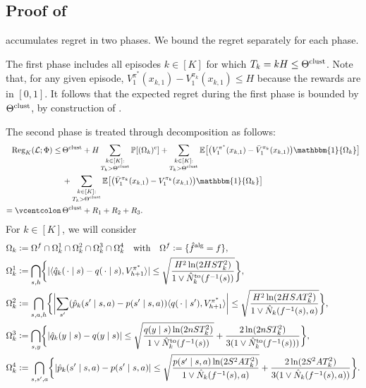 \documentclass[11pt]{article}
\newcommand{\defeq}{=\vcentcolon}
\newcommand{\eqdef}{\vcentcolon=}
\newcommand{\mbb}[1]{\mathbbm{#1}}
\newcommand{\mcL}{\mathcal{L}}
\newcommand{\mbbP}{\mathbb{P}}
\newcommand{\mbbE}{\mathbb{E}}
\newcommand{\clust}{\textnormal{clust}}
\newcommand{\alg}{\textnormal{alg}}
\theoremstyle{definition}
\theoremstyle{definition}
\begin{document}
\subsection{Proof of \texorpdfstring{}{the regret upper bound}}
\label{sec:proof_of_BUCBVI_regret_bound}

 accumulates regret in two phases.
We bound the regret separately for each phase.

The first phase includes all episodes $k\in[K]$ for which $T_k=kH\leq \Theta^{\clust}$.
Note that, for any given episode, $V^{\pi^*}_1(x_{k,1})-V_1^{\pi_k}(x_{k,1})\leq H$ because the rewards are in $[0,1]$.
It follows that the expected regret during the first phase is bounded by $\Theta^{\clust}$, by construction of .

The second phase is treated through decomposition as follows:
\begin{align}
	\text{Reg}_K(\mcL;\Phi)
	\leq
	\,
	&
	\Theta^{\clust}
	+
	H\sum_{\substack{k\in[K]:\\T_k>\Theta^{\clust}}}\mbbP[(\Omega_k)^{\mathrm{c}}]
	+
	\sum_{\substack{k\in[K]:\\T_k>\Theta^{\clust}}}\mbbE\bigl[\bigl( V^{\pi^*}_1(x_{k,1})-\bar{V}^{\pi_k}_1(x_{k,1})\bigr) \mbb{1}\{\Omega_k\}\bigr]
	\nonumber
	\\
	&
	+
	\sum_{\substack{k\in[K]:\\T_k>\Theta^{\clust}}}\mbbE\bigl[\bigl( \bar{V}^{\pi_k}_1(x_{k,1})-V_1^{\pi_k}(x_{k,1})\bigr) \mbb{1}\{\Omega_k\}\bigr]
	\nonumber
	\\
	\defeq
	\,
	&
	\Theta^{\clust}
	+
	R_1
	+
	R_2
	+
	R_3
	.
	\label{eqn:regret_decomp}
\end{align}
For $k\in[K]$, we will consider
\begin{align}
	&
	\Omega_k
	\eqdef
	\Omega^f\cap \Omega_k^1\cap\Omega_k^2\cap\Omega_k^3\cap\Omega_k^4
	\quad
	\mathrm{with}
	\quad
	\Omega^{f}
	\eqdef
	\{ \hat{f}^{\alg}=f \}
	,
	\nonumber
	\\
	&
	\Omega_k^{1}
	\eqdef
	\bigcap_{s,h}\biggl\{
	|\langle \hat{q}_k(\,\cdot\mid s)-q(\,\cdot\mid s), V^{\pi^*}_{h+1}\rangle|
	\leq
	\sqrt{\frac{H^2 \ln(2HST_k^2)}{1\vee \hat{N}^{\mathrm{to}}_k(f^{-1}(s))}}
	\biggr\}
	,
	\nonumber
	\\
	&
	\Omega_k^{2}
	\eqdef
	\bigcap_{s,a,h}
	\biggl\{
	\biggl|\sum_{s'} (\hat{p}_k(s'\mid s,a)-p(s'\mid s,a)) \langle q(\,\cdot\mid s'), V^{\pi^*}_{h+1}\rangle \biggr|
	\leq
	\sqrt{\frac{H^2 \ln(2HSAT_k^2)}{1\vee \hat{N}_k(f^{-1}(s),a)}}
	\biggr\}
	,
	\label{eqn:highprobeventcomponentdef}
	\\
	&
	\Omega_k^{3}
	\eqdef
	\bigcap_{s,y}
	\biggl\{
	|\hat{q}_k(y\mid s)-q(y\mid s)|
	\leq
	\sqrt{\frac{q(y\mid s) \ln(2nST_k^2)}{1\vee\hat{N}^{\mathrm{to}}_k(f^{-1}(s))}}
	+
	\frac{2\ln(2nST_k^2)}{3(1\vee\hat{N}^{\mathrm{to}}_k(f^{-1}(s)))}
	\biggr\}
	,
	\nonumber
	\\
	&
	\Omega_k^{4}
	\eqdef
	\bigcap_{s,s',a}
	\biggl\{
	|\hat{p}_k(s'\mid s,a)-p(s'\mid s,a)|
	\leq
	\sqrt{\frac{p(s'\mid s,a) \ln(2S^2AT_k^2)}{1\vee\hat{N}_k(f^{-1}(s),a)}}
	+
	\frac{2\ln(2S^2AT_k^2)}{3(1\vee\hat{N}_k(f^{-1}(s),a))}
	\biggr\}
	.
	\nonumber
\end{align}
\end{document}
